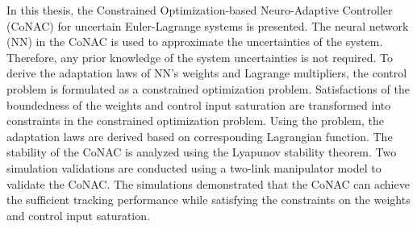 
\summary

In this thesis, the Constrained Optimization-based Neuro-Adaptive Controller \allowbreak (CoNAC) for uncertain Euler-Lagrange systems is presented. 
The neural network (NN) in the CoNAC is used to approximate the uncertainties of the system.
Therefore, any prior knowledge of the system uncertainties is not required.
To derive the adaptation laws of NN's weights and Lagrange multipliers, the control problem is formulated as a constrained optimization problem.
Satisfactions of the boundedness of the weights and control input saturation are transformed into constraints in the constrained optimization problem.
Using the problem, the adaptation laws are derived based on corresponding Lagrangian function.
The stability of the CoNAC is analyzed using the Lyapunov stability theorem.
Two simulation validations are conducted using a two-link manipulator model to validate the CoNAC.
The simulations demonstrated that the CoNAC can achieve the sufficient tracking performance while satisfying the constraints on the weights and control input saturation.

